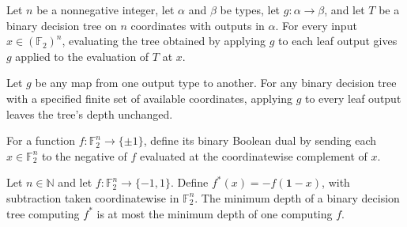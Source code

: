 \begin{theorem}
\leanok
{}
Let $n$ be a nonnegative integer, let $\alpha$ and $\beta$ be types, let
$g:\alpha\to\beta$, and let $T$ be a binary decision tree on $n$ coordinates with
outputs in $\alpha$. For every input $x\in(\mathbb{F}_2)^n$, evaluating the tree
obtained by applying $g$ to each leaf output gives $g$ applied to the evaluation of $T$
at $x$.
\end{theorem}

\begin{theorem}
\leanok
{}
Let $g$ be any map from one output type to another. For any binary decision tree with a
specified finite set of available coordinates, applying $g$ to every leaf output leaves
the tree's depth unchanged.
\end{theorem}

\begin{definition}
\label{FABL.binaryBooleanDual}
\leanok
{}
For a function $f:\mathbb F_2^n\to\{\pm1\}$, define its binary Boolean dual by sending
each $x\in\mathbb F_2^n$ to the negative of $f$ evaluated at the coordinatewise
complement of $x$.
\end{definition}

\begin{theorem}
\label{FABL.decisionTreeDepth_binaryBooleanDual_le}
\leanok
{}
Let $n\in\mathbb{N}$ and let $f:\mathbb{F}_2^n\to\{−1,1\}$. Define
$f^*(x)=-f(\mathbf{1}-x)$, with subtraction taken coordinatewise in $\mathbb{F}_2^n$.
The minimum depth of a binary decision tree computing $f^*$ is at most the minimum depth
of one computing $f$.
\end{theorem}

